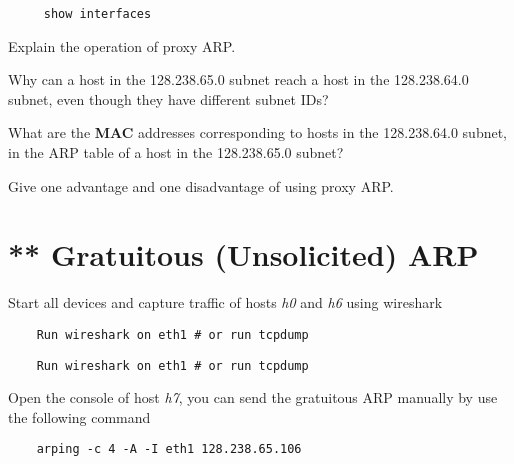 \documentclass{UTNetLab}
\begin{document}
\begin{lstlisting}
	 show interfaces
\end{lstlisting}
    
    \begin{report}
        \item Explain the operation of proxy ARP.

        \item Why can a host in the 128.238.65.0 subnet reach a host in the 128.238.64.0 subnet, even though they have different subnet IDs?

        \item What are the \textbf{MAC} addresses corresponding to hosts in the 128.238.64.0 subnet, in the ARP table of a host in the 128.238.65.0 subnet?

        \item Give one advantage and one disadvantage of using proxy ARP.
    \end{report}

\section{** Gratuitous (Unsolicited) ARP}
    
    Start all devices and capture traffic of hosts \textit{h0} and \textit{h6} using wireshark

    \begin{lstlisting}
    Run wireshark on eth1 # or run tcpdump
    \end{lstlisting}

    \begin{lstlisting}
    Run wireshark on eth1 # or run tcpdump
    \end{lstlisting}
    
    Open the console of host \textit{h7}, you can send the gratuitous ARP manually by use the following command 
    
    \begin{lstlisting}
    arping -c 4 -A -I eth1 128.238.65.106
    \end{lstlisting}
    
\end{document}
